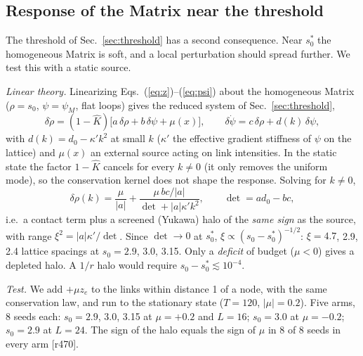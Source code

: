 \documentclass[reprint,pre,amsmath,amssymb,superscriptaddress,nofootinbib]{revtex4-2}
\newcommand{\sz}{s_0}
\newcommand{\szc}{s_0^{*}}
\begin{document}
\subsection{Response of the Matrix near the threshold}\label{sec:critical}
The threshold of Sec.~\ref{sec:threshold} has a second consequence. Near $\szc$ the homogeneous Matrix is soft, and a local perturbation should spread further. We test this with a static source.

\emph{Linear theory.} Linearizing Eqs.~(\ref{eq:z})--(\ref{eq:psi}) about the homogeneous Matrix ($\rho=\sz$, $\psi=\psi_M$, flat loops) gives the reduced system of Sec.~\ref{sec:threshold},
\begin{equation}
\delta\dot\rho=(1-\hat K)\big[a\,\delta\rho+b\,\delta\psi+\mu(x)\big],\qquad \delta\dot\psi=c\,\delta\rho+d(k)\,\delta\psi, \label{eq:lin}
\end{equation}
with $d(k)=d_0-\kappa' k^2$ at small $k$ ($\kappa'$ the effective gradient stiffness of $\psi$ on the lattice) and $\mu(x)$ an external source acting on link intensities. In the static state the factor $1-\hat K$ cancels for every $k\neq0$ (it only removes the uniform mode), so the conservation kernel does not shape the response. Solving for $k\neq0$,
\begin{equation}
\delta\rho(k)=\frac{\mu}{|a|}+\frac{\mu\,bc/|a|}{\det+|a|\kappa' k^2},\qquad \det=a d_0-bc,
\end{equation}
i.e.\ a contact term plus a screened (Yukawa) halo of the \emph{same sign} as the source, with range $\xi^2=|a|\kappa'/\det$. Since $\det\to0$ at $\szc$, $\xi\propto(\sz-\szc)^{-1/2}$: $\xi=4.7$, 2.9, 2.4 lattice spacings at $\sz=2.9$, 3.0, 3.15. Only a \emph{deficit} of budget ($\mu<0$) gives a depleted halo. A $1/r$ halo would require $\sz-\szc\lesssim10^{-4}$.

\emph{Test.} We add $+\mu z_e$ to the links within distance 1 of a node, with the same conservation law, and run to the stationary state ($T=120$, $|\mu|=0.2$). Five arms, 8 seeds each: $\sz=2.9$, 3.0, 3.15 at $\mu=+0.2$ and $L=16$; $\sz=3.0$ at $\mu=-0.2$; $\sz=2.9$ at $L=24$. The sign of the halo equals the sign of $\mu$ in 8 of 8 seeds in every arm [r470].
\end{document}
